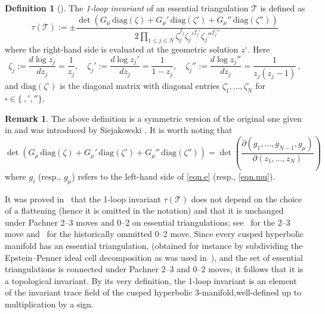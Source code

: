 \documentclass[12pt,reqno]{amsart}
\theoremstyle{definition}
\newtheorem{definition}[theorem]{Definition}
\newtheorem{remark}[theorem]{Remark}
\def\calT{\mathcal T}
\begin{document}
\begin{definition}[\cite{DG1}]
The \emph{1-loop invariant} of an essential triangulation $\calT$ is defined as
\begin{equation*}
\tau(\calT)  :=  \pm
\frac{ \det \left( G_\mu\, \mathrm{diag}(\zeta)	+G_\mu' \, \mathrm{diag}(\zeta')
+ G_\mu'' \, \mathrm{diag}(\zeta'') \right)}{2 \!\!
\displaystyle\prod_{1 \leq j \leq N} \! \!
\zeta_j^{f_j} {\zeta_j'}^{f_j'} {\zeta_j''}^{f_j''}} 
\end{equation*}
where the right-hand side is evaluated at the geometric solution $z^\circ$. Here
\begin{equation*}
\zeta_j := \frac{d \log z_j}{dz_j}=\frac{1}{z_j}, \quad
\zeta_j' := \frac{d \log z_j'}{dz_j}=\frac{1}{1-z_j},\quad
\zeta_j'' := \frac{d \log z_j''}{dz_j}=\frac{1}{z_j(z_j-1)}   \, ,
\end{equation*}
and
$\mathrm{diag}(\zeta^\square)$ is the diagonal matrix with diagonal entries
$\zeta^\square_1,\ldots,\zeta^\square_N$ for  $\square \in \{ \ , ' ,''\}$.
\end{definition}

\begin{remark}
\label{rmk.der}
The above definition is a symmetric version of the original one given in \cite{DG1}
and was introduced by Siejakowski \cite{Sie21}. It is worth noting that  
\begin{equation*}
\det \left( G_\mu\, \mathrm{diag}(\zeta)+G_\mu' \, \mathrm{diag}(\zeta')+ G_\mu'' \,
\mathrm{diag}(\zeta'') \right) = \det
\left( \dfrac{\partial (g_1,\ldots, g_{N-1}, g_\mu)} {\partial (z_1,\ldots,z_N)}\right)
\end{equation*}
where $g_i$ (resp., $g_\mu$) refers to the left-hand side of
\eqref{eqn.e} (resp., \eqref{eqn.mu}).
\end{remark} 

It was proved in~\cite{DG1} that the 1-loop invariant $\tau(\calT)$ does not depend
on the choice of a flattening (hence it is omitted in the notation) and that it is
unchanged under Pachner 2--3 moves and 0--2 on essential triangulations;
see~\cite[Sec.3]{DG1} for the 2--3 move and~\cite[Prop.5.1]{PW2023} for the
historically ommitted 0--2 move. Since every cusped hyperbolic
manifold has an essential triangulation, (obtained for instance by subdividing the
Epstein--Penner ideal cell decomposition as was used in~\cite{DG1}), and the set
of essential triangulations is connected under Pachner 2--3 and 0--2 moves, it
follows that it is a topological invariant. By its very definition, the 1-loop
invariant is an element of the invariant trace field of the cusped hyperbolic
3-manifold,well-defined up to multiplication by a sign.
\end{document}
